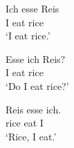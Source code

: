 \ea
\gll Ich esse Reis\\
     I eat rice \\
\glt `I eat rice.'
\z

\ea
\gll Esse ich Reis?\\
     I eat rice \\
\glt `Do I eat rice?'
\z

\ea
\gll Reis esse ich.\\
    rice eat I \\
\glt `Rice, I eat.'
\z